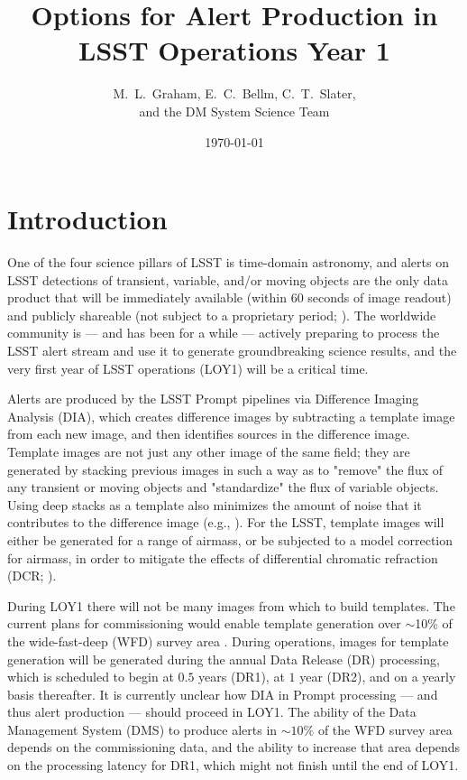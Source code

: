 \documentclass[DM,lsstdraft,toc]{lsstdoc}
\title[Alert Production in Year 1]{Options for Alert Production in \\ LSST Operations Year 1}
\author{M.~L.~Graham, E.~C.~Bellm, C.~T.~Slater, \\ and the DM System Science Team}
\date{\today}
\begin{document}
\maketitle


\section{Introduction} \label{sec:intro}

One of the four science pillars of LSST is time-domain astronomy, and alerts on LSST detections of transient, variable, and/or moving objects are the only data product that will be immediately available (within $60$ seconds of image readout) and publicly shareable (not subject to a proprietary period; ). The worldwide community is --- and has been for a while --- actively preparing to process the LSST alert stream and use it to generate groundbreaking science results, and the very first year of LSST operations (LOY1) will be a critical time.

Alerts are produced by the LSST Prompt pipelines via Difference Imaging Analysis (DIA), which creates difference images by subtracting a template image from each new image, and then identifies sources in the difference image. Template images are not just any other image of the same field; they are generated by stacking previous images in such a way as to "remove" the flux of any transient or moving objects and "standardize" the flux of variable objects. Using deep stacks as a template also minimizes the amount of noise that it contributes to the difference image (e.g., ). For the LSST, template images will either be generated for a range of airmass, or be subjected to a model correction for airmass, in order to mitigate the effects of differential chromatic refraction (DCR; ).

During LOY1 there will not be many images from which to build templates. The current plans for commissioning would enable template generation over $\sim$10\% of the wide-fast-deep (WFD) survey area . During operations, images for template generation will be generated during the annual Data Release (DR) processing, which is scheduled to begin at $0.5$ years (DR1), at $1$ year (DR2), and on a yearly basis thereafter. It is currently unclear how DIA in Prompt processing --- and thus alert production --- should proceed in LOY1. The ability of the Data Management System (DMS) to produce alerts in $\sim10\%$ of the WFD survey area depends on the commissioning data, and the ability to increase that area depends on the processing latency for DR1, which might not finish until the end of LOY1. 
\end{document}
